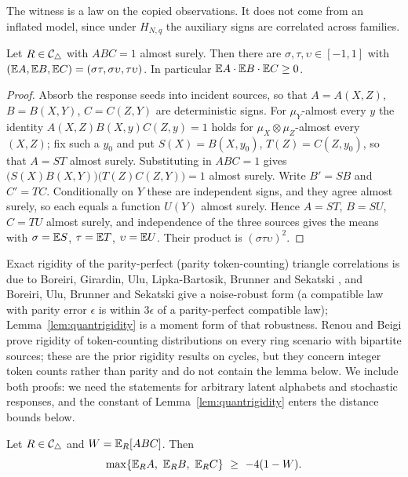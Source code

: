 The witness is a law on the copied observations. It does not come from an inflated model, since under $H_{N,q}$ the auxiliary signs are correlated across families.

\begin{lemma}\label{lem:parityrigidity}
Let $R\in\mathcal C_{\triangle}$ with $ABC=1$ almost surely. Then there are $\sigma,\tau,\upsilon\in[-1,1]$ with $(\mathbb E A,\mathbb E B,\mathbb E C)=(\sigma\tau,\sigma\upsilon,\tau\upsilon)$. In particular $\mathbb E A\cdot\mathbb E B\cdot\mathbb E C\ge0$.
\end{lemma}

\begin{proof}
Absorb the response seeds into incident sources, so that $A=A(X,Z)$, $B=B(X,Y)$, $C=C(Z,Y)$ are deterministic signs. For $\mu_Y$-almost every $y$ the identity $A(X,Z)B(X,y)C(Z,y)=1$ holds for $\mu_X\otimes\mu_Z$-almost every $(X,Z)$; fix such a $y_0$ and put $S(X)=B(X,y_0)$, $T(Z)=C(Z,y_0)$, so that $A=ST$ almost surely. Substituting in $ABC=1$ gives $\bigl(S(X)B(X,Y)\bigr)\bigl(T(Z)C(Z,Y)\bigr)=1$ almost surely. Write $B'=SB$ and $C'=TC$. Conditionally on $Y$ these are independent signs, and they agree almost surely, so each equals a function $U(Y)$ almost surely. Hence $A=ST$, $B=SU$, $C=TU$ almost surely, and independence of the three sources gives the means with $\sigma=\mathbb E S$, $\tau=\mathbb E T$, $\upsilon=\mathbb E U$. Their product is $(\sigma\tau\upsilon)^2$.
\end{proof}

Exact rigidity of the parity-perfect (parity token-counting) triangle correlations is due to Boreiri, Girardin, Ulu, Lipka-Bartosik, Brunner and Sekatski \cite{BoreiriEtAl2023}, and Boreiri, Ulu, Brunner and Sekatski \cite{BoreiriEtAl2025} give a noise-robust form (a compatible law with parity error $\epsilon$ is within $3\epsilon$ of a parity-perfect compatible law); Lemma~\ref{lem:quantrigidity} is a moment form of that robustness. Renou and Beigi \cite{RenouBeigi2022PRA,RenouBeigi2022PRL} prove rigidity of token-counting distributions on every ring scenario with bipartite sources; these are the prior rigidity results on cycles, but they concern integer token counts rather than parity and do not contain the lemma below. We include both proofs: we need the statements for arbitrary latent alphabets and stochastic responses, and the constant of Lemma~\ref{lem:quantrigidity} enters the distance bounds below.

\begin{lemma}\label{lem:quantrigidity}
Let $R\in\mathcal C_{\triangle}$ and $W=\mathbb E_R[ABC]$. Then
\[
\max\{\E_RA,\ \E_RB,\ \E_RC\}\ \ge\ -4(1-W).
\]
\end{lemma}

